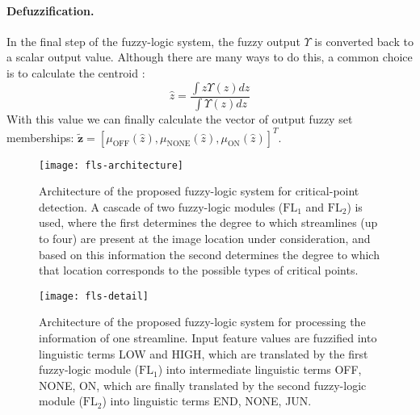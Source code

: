 \documentclass[twocolumn,natbib]{svjour3}
\begin{document}
\paragraph{Defuzzification.} In the final step of the fuzzy-logic system, the fuzzy output $\Upsilon$ is converted back to a scalar output value. Although there are many ways to do this, a common choice is to calculate the centroid \citep{mendel1995fuzzy}:
\begin{equation}
\label{eq:centroid-general}
\hat{z} = \frac{\int z\Upsilon(z)dz}{\int\Upsilon(z)dz} 
\end{equation}
With this value we can finally calculate the vector of output fuzzy set memberships: $\tilde{\mathbf{z}}=[\mu_{\textrm{OFF}}(\hat{z}),\mu_{\textrm{NONE}}(\hat{z}),\mu_{\textrm{ON}}(\hat{z})]^{T}$.

\begin{figure}[!t]
\centering
\texttt{[image: fls-architecture]}
\caption{Architecture of the proposed fuzzy-logic system for critical-point detection. A cascade of two fuzzy-logic modules ($\textrm{FL}_{1}$ and $\textrm{FL}_{2}$) is used, where the first determines the degree to which streamlines (up to four) are present at the image location under consideration, and based on this information the second determines the degree to which that location corresponds to the possible types of critical points.}
\label{fig:fls-architecture}
\end{figure}

\begin{figure}[!t]
\centering
\texttt{[image: fls-detail]}
\caption{Architecture of the proposed fuzzy-logic system for processing the information of one streamline. Input feature values are fuzzified into linguistic terms LOW and HIGH, which are translated by the first fuzzy-logic module ($\textrm{FL}_{1}$) into intermediate linguistic terms OFF, NONE, ON, which are finally translated by the second fuzzy-logic module ($\textrm{FL}_{2}$) into linguistic terms END, NONE, JUN.}
\label{fig:fls-detail}
\end{figure}
\end{document}
